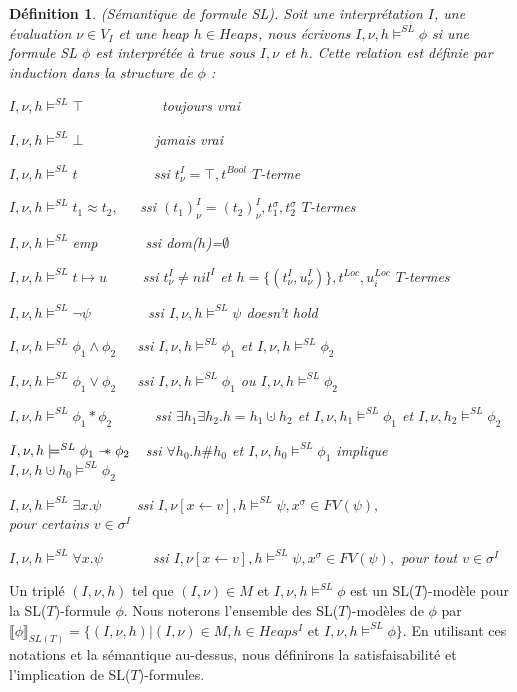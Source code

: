 \documentclass[9pt,openany]{book}
\newcommand\sepimp{\mathrel{-\mkern-6mu*}}
\newcommand\phibra{\llbracket\phi\rrbracket}
\newtheorem{definition}{D\'efinition}[section]
\begin{document}
	\begin{definition}
	(S\'emantique de formule SL). Soit une interpr\'etation $I$, une \'evaluation $\nu\in V_{I}$ et une heap $h\in Heaps$, nous \'ecrivons $I,\nu,h\models^{SL}\phi$ si une formule SL $\phi$ est interpr\'et\'ee \`a true sous $I,\nu$ et $h$. Cette relation est d\'efinie par induction  dans la structure de $\phi$ :\par
	$I,\nu,h\models^{SL}\top$~~~~~~~~~~~toujours vrai\par
$I,\nu,h\models^{SL}\bot$~~~~~~~~~~jamais vrai\par
$I,\nu,h\models^{SL} t$~~~~~~~~~~ ssi $t^{I}_{\nu}=\top,t^{Bool}$ $T$-terme\par
$I,\nu,h\models^{SL} t_{1}\approx t_{2},$~~~ssi $(t_{1})^{I}_{\nu}=(t_{2})^{I}_{\nu},t^{\sigma}_{1},t^{\sigma}_{2}$ $T$-termes\par
$I,\nu,h\models^{SL}$emp ~~~~~~ssi dom($h$)=$\emptyset$\par
$I,\nu,h\models^{SL}t\mapsto u$~~~~~ssi $t^{I}_{\nu}\neq nil^{I}$ et $h = \{(t^{I}_{\nu},u^{I}_{\nu} )\}, t^{Loc}, u^{Loc}_{i}$ $T$-termes \par
$I,\nu,h\models^{SL}\neg\psi$~~~~~~~~ssi $I,\nu,h\models^{SL}\psi$ doesn't hold\par
$I,\nu,h\models^{SL}\phi_{1}\land\phi_{2}$~~~ssi $I,\nu,h\models^{SL}\phi_{1}$ et $I,\nu,h\models^{SL}\phi_{2}$\par
$I,\nu,h\models^{SL}\phi_{1}\lor\phi_{2}$~~~ssi $I,\nu,h\models^{SL}\phi_{1}$ ou $I,\nu,h\models^{SL}\phi_{2}$\par
$I,\nu,h\models^{SL}\phi_{1}*\phi_{2}$~~~~~~ssi $\exists h_{1}\exists h_{2}.h=h_{1}\cupdot h_{2}$ et $I,\nu,h_{1}\models^{SL}\phi_{1}$ et $I,\nu,h_{2}\models^{SL}\phi_{2}$\par
$I,\nu,h\models^{SL}\phi_{1}\sepimp\phi_{2}$~~ssi $\forall h_{0}.h\#h_{0}$ et $I,\nu,h_{0}\models^{SL}\phi_{1}$ implique \\$I,\nu,h\cupdot h_{0}\models^{SL}\phi_{2}$\par
$I,\nu,h\models^{SL}\exists x.\psi$~~~~~ssi $I,\nu[x\leftarrow v],h\models^{SL}\psi, x^{\sigma}\in FV(\psi),$ \\pour certains $v\in\sigma^{I}$\par
$I,\nu,h\models^{SL}\forall x.\psi$~~~~~~~ssi $I,\nu[x\leftarrow v],h\models^{SL}\psi, x^{\sigma}\in FV(\psi),$ pour tout $v\in\sigma^{I}$
	\end{definition}
	Un tripl\'e $(I,\nu,h)$ tel que $(I,\nu)\in M$ et $I,\nu,h\models^{SL}\phi$ est un SL($T$)-mod\`ele pour la SL($T$)-formule $\phi$. Nous noterons l'ensemble des SL($T$)-mod\`eles de $\phi$ par $\phibra_{SL(T)} = \{(I,\nu,h)|(I,\nu)\in M,h\in Heaps^{I}$ et $I,\nu,h\models^{SL}\phi\}$. En utilisant ces notations et la s\'emantique au-dessus, nous d\'efinirons la satisfaisabilit\'e et l'implication de SL($T$)-formules.
\end{document}
